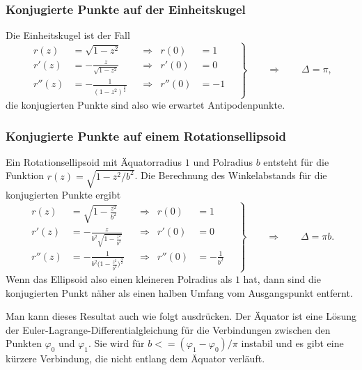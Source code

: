 \subsubsection{Konjugierte Punkte auf der Einheitskugel}
Die Einheitskugel ist der Fall
\begin{equation}
\left.
\begin{aligned}
r(z)
&=
\sqrt{1-z^2}
&&\Rightarrow&
r(0)&=1
\\
r'(z)
&=
-
\frac{z}{\sqrt{1-z^2}}
&&\Rightarrow&
r'(0)&=0
\\
r''(z)
&=
-
\frac{1}{(1-z^2)^{\frac32}}
&&\Rightarrow&
r''(0)&=-1
\end{aligned}
\quad
\right\}
\qquad\Rightarrow\qquad
\Delta
=
\pi,
\end{equation}
die konjugierten Punkte sind also wie erwartet Antipodenpunkte.

%
%
\subsubsection{Konjugierte Punkte auf einem Rotationsellipsoid}
Ein Rotationsellipsoid mit Äquatorradius $1$ und Polradius $b$
entsteht für die Funktion $r(z)=\sqrt{1-z^2/b^2}$.
Die Berechnung des Winkelabstands für die konjugierten Punkte
ergibt
\begin{equation}
\left.
\begin{aligned}
r(z) &= \sqrt{1-\frac{z^2}{b^2}}
&&\Rightarrow&
r(0) &= 1
\\
r'(z) &= -\frac{z}{\displaystyle b^2\sqrt{1-\frac{z^2}{b^2}}}
&&\Rightarrow&
r'(0) &= 0
\\
r''(z)
&=
-\frac{1}{b^2\biggl(\displaystyle1-\frac{z^2}{b^2}\biggr)^{\frac32}}
&&\Rightarrow&
r''(0) &= -\frac{1}{b^2}
\end{aligned}
\quad
\right\}
\qquad\Rightarrow\qquad
\Delta
=
\pi b.
\end{equation}
Wenn das Ellipsoid also einen kleineren Polradius als $1$ hat, dann
sind die konjugierten Punkt näher als einen halben Umfang vom
Ausgangspunkt entfernt.

Man kann dieses Resultat auch wie folgt ausdrücken.
Der Äquator ist eine Lösung der Euler-Lagrange-Differentialgleichung
für die Verbindungen zwischen den Punkten $\varphi_0$ und $\varphi_1$.
Sie wird für $b <= (\varphi_1-\varphi_0)/\pi$ instabil und es gibt
eine kürzere Verbindung, die nicht entlang dem Äquator verläuft.

%
%
